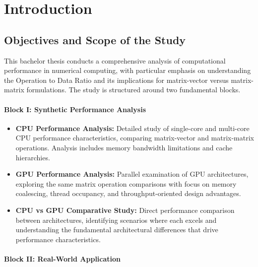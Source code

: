 
\chapter{Introduction}
\label{ch::chapter1}

\vspace{-1cm}

\section{Objectives and Scope of the Study}

This bachelor thesis conducts a comprehensive analysis of computational performance in numerical computing, with particular emphasis on understanding the Operation to Data Ratio and its implications for matrix-vector versus matrix-matrix formulations. The study is structured around two fundamental blocks.

\vspace{-1em}

\subsubsection*{Block I: Synthetic Performance Analysis}

\begin{itemize}
    \item \textbf{CPU Performance Analysis:} Detailed study of single-core and multi-core CPU performance characteristics, comparing matrix-vector and matrix-matrix operations. Analysis includes memory bandwidth limitations and cache hierarchies.
    
    \item \textbf{GPU Performance Analysis:} Parallel examination of GPU architectures, exploring the same matrix operation comparisons with focus on memory coalescing, thread occupancy, and throughput-oriented design advantages.
    
    \item \textbf{CPU vs GPU Comparative Study:} Direct performance comparison between architectures, identifying scenarios where each excels and understanding the fundamental architectural differences that drive performance characteristics.
\end{itemize}

\vspace{-1em}

\subsubsection*{Block II: Real-World Application}

